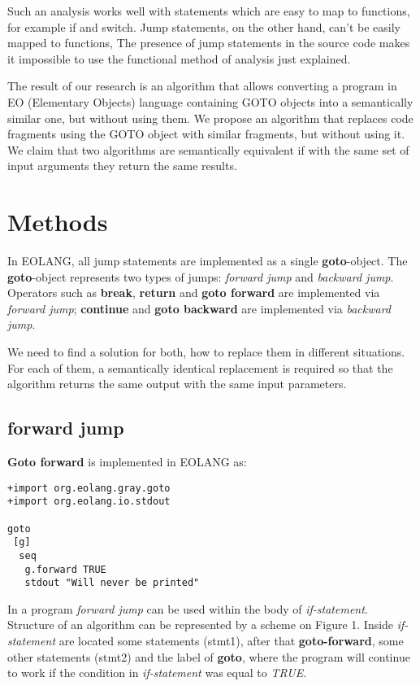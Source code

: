 \documentclass[two column]{article}
\begin{document}
Such an analysis works well with statements which are easy to map to functions, for example if and switch. Jump statements, on the other hand, can't be easily mapped to functions, The presence of jump statements in the source code makes it impossible to use the functional method of analysis just explained.

The result of our research is an algorithm that allows converting a program in EO (Elementary Objects) language containing GOTO objects into a semantically similar one, but without using them. We propose an algorithm that replaces code fragments using the GOTO object with similar fragments, but without using it. We claim that two algorithms are semantically equivalent if with the same set of input arguments they return the same results.

\section{Methods}
In EOLANG, all jump statements are implemented as a single \textbf{goto}-object. The \textbf{goto}-object represents two types of jumps: \textit{forward jump} and \textit{backward jump}. Operators such as \textbf{break}, \textbf{return} and \textbf{goto forward} are implemented via \textit{forward jump}; \textbf{continue} and \textbf{goto backward} are implemented via \textit{backward jump}.

We need to find a solution for both, how to replace them in different situations. For each of them, a semantically identical replacement is required so that the algorithm returns the same output with the same input parameters. 

\subsection{forward jump}
\textbf{Goto forward} is implemented in EOLANG as:
\begin{lstlisting}
+import org.eolang.gray.goto
+import org.eolang.io.stdout

goto
 [g]
  seq
   g.forward TRUE
   stdout "Will never be printed"
\end{lstlisting}

In a program \textit{forward jump} can be used within the body of \textit{if-statement}. Structure of an algorithm can be represented by a scheme on Figure 1. Inside \textit{if-statement} are located some statements (stmt1), after that \textbf{goto-forward}, some other statements (stmt2) and the label of \textbf{goto}, where the program will continue to work if the condition in \textit{if-statement} was equal to \textit{TRUE}.
\end{document}
